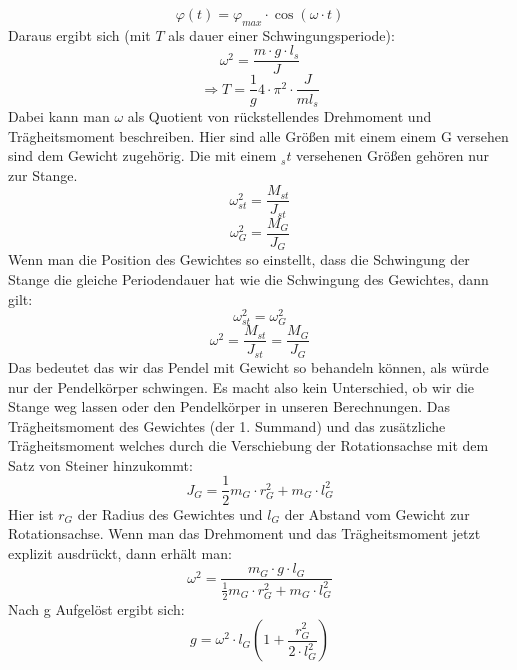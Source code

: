 \documentclass[twoside]{protokoll}
\begin{document}
\begin{equation}
    \varphi(t) = \varphi_{max} \cdot \cos(\omega \cdot t)
\end{equation}
Daraus ergibt sich (mit $T$ als dauer einer Schwingungsperiode):
\begin{equation}
    \omega^2 = \frac{m \cdot g \cdot l_s}{J}
\end{equation}
\begin{equation}
    \Rightarrow T = \frac{1}{g} 4 \cdot \pi^2 \cdot \frac{J}{m l_s}
\end{equation}
Dabei kann man $\omega$ als Quotient von rückstellendes Drehmoment und Trägheitsmoment beschreiben.
Hier sind alle Größen mit einem einem G versehen sind dem Gewicht zugehörig. Die mit einem $_st$ versehenen Größen gehören nur zur Stange.
\begin{equation}
    \omega_{st}^2 = \frac{M_{st}}{J_{st}}
\end{equation}
\begin{equation}
    \omega_{G}^2 = \frac{M_G}{J_G}
\end{equation}
Wenn man die Position des Gewichtes so einstellt, dass die Schwingung der Stange die gleiche Periodendauer hat wie die Schwingung des Gewichtes, dann gilt:
\begin{equation}
    \omega_{st}^2 = \omega_{G}^2
\end{equation}
\begin{equation}
    \omega^2 = \frac{M_{st}}{J_{st}} = \frac{M_G}{J_G}
\end{equation}
Das bedeutet das wir das Pendel mit Gewicht so behandeln können, als würde nur der Pendelkörper schwingen. 
Es macht also kein Unterschied, ob wir die Stange weg lassen oder den Pendelkörper in unseren Berechnungen.
Das Trägheitsmoment des Gewichtes (der 1. Summand) und das zusätzliche Trägheitsmoment welches durch die Verschiebung der Rotationsachse mit dem Satz von Steiner hinzukommt:
\begin{equation}
    J_G = \frac{1}{2} m_G \cdot r_G^2 + m_G \cdot l_G^2
\end{equation}
Hier ist $r_G$ der Radius des Gewichtes und $l_G$ der Abstand vom Gewicht zur Rotationsachse.
Wenn man das Drehmoment und das Trägheitsmoment jetzt explizit ausdrückt, dann erhält man:
\begin{equation}
    \omega^2 = \frac{m_G \cdot g \cdot l_G}{\frac{1}{2} m_G \cdot r_G^2 + m_G \cdot l_G^2}
\end{equation}
Nach g Aufgelöst ergibt sich:
\begin{equation}
    g = \omega^2 \cdot l_G \left( 1 + \frac{r_G^2}{2 \cdot l_G^2} \right)
    \label{eq:pendel_g}
\end{equation}
\end{document}
